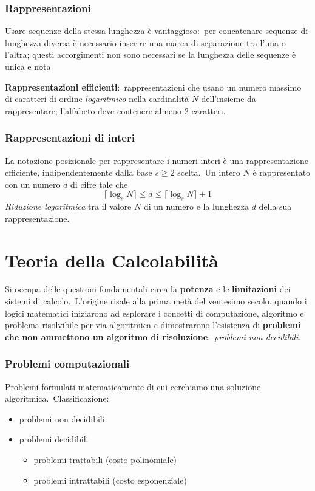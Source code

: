 \subsubsection{Rappresentazioni}

Usare sequenze della stessa lunghezza è vantaggioso:\ per concatenare sequenze di lunghezza diversa è necessario inserire una marca di separazione tra l'una o l'altra; questi accorgimenti non sono necessari se la lunghezza delle sequenze è unica e nota.

\textbf{Rappresentazioni efficienti}:\ rappresentazioni che usano un numero massimo di caratteri di ordine \textit{logaritmico} nella cardinalità $N$ dell'insieme da rappresentare; l'alfabeto deve contenere almeno 2 caratteri.\

\subsubsection{Rappresentazioni di interi}
La notazione posizionale per rappresentare i numeri interi è una rappresentazione efficiente, indipendentemente dalla base $s \geq 2$ scelta.\
Un intero $N$ è rappresentato con un numero $d$ di cifre tale che \[\lceil\log_sN\rceil\leq d \leq  \lceil\log_sN\rceil+1\]
\textit{Riduzione logaritmica} tra il valore $N$ di un numero e la lunghezza $d$ della sua rappresentazione.\

\section{Teoria della Calcolabilità}

Si occupa delle questioni fondamentali circa la \textbf{potenza} e le \textbf{limitazioni} dei sistemi di calcolo.\
L'origine risale alla prima metà del ventesimo secolo, quando i logici matematici iniziarono ad esplorare i concetti di computazione, algoritmo e problema risolvibile per via algoritmica e dimostrarono l'esistenza di \textbf{problemi che non ammettono un algoritmo di risoluzione}:\ \textit{problemi non decidibili}.\

\subsubsection{Problemi computazionali}

Problemi formulati matematicamente di cui cerchiamo una soluzione algoritmica.\
Classificazione:
\begin{itemize}
    \item problemi non decidibili
    \item problemi decidibili
          \begin{itemize}
              \item problemi trattabili (costo polinomiale)
              \item problemi intrattabili (costo esponenziale)
          \end{itemize}
\end{itemize}

